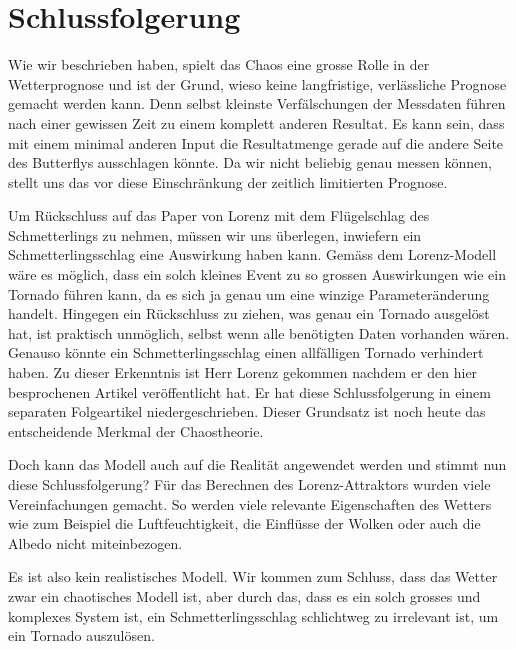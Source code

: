 \section{Schlussfolgerung}\label{outro}
Wie wir beschrieben haben, spielt das Chaos eine grosse Rolle in der Wetterprognose und ist der Grund, wieso keine langfristige, verlässliche Prognose gemacht werden kann. Denn selbst kleinste Verfälschungen der Messdaten führen nach einer gewissen Zeit zu einem komplett anderen Resultat. Es kann sein, dass mit einem minimal anderen Input die Resultatmenge gerade auf die andere Seite des Butterflys ausschlagen könnte. Da wir nicht beliebig genau messen können, stellt uns das vor diese Einschränkung der zeitlich limitierten Prognose.

Um Rückschluss auf das Paper von Lorenz mit dem Flügelschlag des Schmetterlings zu nehmen, müssen wir uns überlegen, inwiefern ein Schmetterlingsschlag eine Auswirkung haben kann. Gemäss dem Lorenz-Modell wäre es möglich, dass ein solch kleines Event zu so grossen Auswirkungen wie ein Tornado führen kann, da es sich ja genau um eine winzige Parameteränderung handelt. Hingegen ein Rückschluss zu ziehen, was genau ein Tornado ausgelöst hat, ist praktisch unmöglich, selbst wenn alle benötigten Daten vorhanden wären. Genauso könnte ein Schmetterlingsschlag einen allfälligen Tornado verhindert haben. Zu dieser Erkenntnis ist Herr Lorenz gekommen nachdem er den hier besprochenen Artikel veröffentlicht hat. Er hat diese Schlussfolgerung in einem separaten Folgeartikel\cite{lorenz63} niedergeschrieben. Dieser Grundsatz ist noch heute das entscheidende Merkmal der Chaostheorie.

Doch kann das Modell auch auf die Realität angewendet werden und stimmt nun diese Schlussfolgerung? Für das Berechnen des Lorenz-Attraktors wurden viele Vereinfachungen gemacht. So werden viele relevante Eigenschaften des Wetters wie zum Beispiel die Luftfeuchtigkeit, die Einflüsse der Wolken oder auch die Albedo nicht miteinbezogen. 

Es ist also kein realistisches Modell. Wir kommen zum Schluss, dass das Wetter zwar ein chaotisches Modell ist, aber durch das, dass es ein solch grosses und komplexes System ist, ein Schmetterlingsschlag schlichtweg zu irrelevant ist, um ein Tornado auszulösen. 
